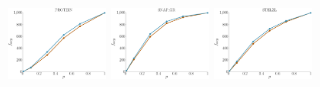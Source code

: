 \documentclass[a4paper]{report}
\newcommand{\wratio}{0.195}
\begin{document}
\vfill
\includegraphics[width=\wratio\textwidth]{influence/PROTEIN/fs_protein}\hfill
\includegraphics[width=\wratio\textwidth]{influence/SNAP_GR/fs_snap_gr}\hfill
\includegraphics[width=\wratio\textwidth]{influence/STELZL/fs_stelzl}\hfill
\clearpage
\end{document}
